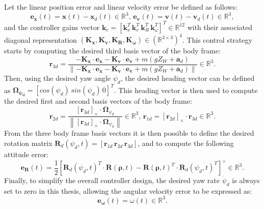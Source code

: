 Let the linear position error and linear velocity error be defined as follows:
\begin{equation}\label{eq:pos_error}
  \boldsymbol{e_x}(t) = \boldsymbol{x}(t) - \boldsymbol{x}_d(t) \in \mathbb{R}^3, \,
  \boldsymbol{e_v}(t) = \boldsymbol{v}(t) - \boldsymbol{v}_d(t) \in \mathbb{R}^3,
\end{equation}
and the controller gains vector \(\boldsymbol{k}_c = [\boldsymbol{k}_{x}^T \, \boldsymbol{k}_{v}^T \, \boldsymbol{k}_{R}^T \, \boldsymbol{k}_{\omega}^T]^T \in \mathbb{R}^{12}\) with their associated diagonal representation $(\boldsymbol{K_x}, \boldsymbol{K_v}, \boldsymbol{K_R}, \boldsymbol{K_\omega}) \in (\mathbb{R}^{3\times3})^4$.
This control strategy starts by computing the desired third basis vector of the body frame:
\begin{equation}
  \boldsymbol{r}_{3d} = \frac{-\boldsymbol{K_x} \cdot \boldsymbol{e_x} - \boldsymbol{K_v} \cdot \boldsymbol{e_v} + m(g Z_W + \boldsymbol{a}_d) }{\left\| -\boldsymbol{K_x} \cdot \boldsymbol{e_x} - \boldsymbol{K_v} \cdot \boldsymbol{e_v} + m(g Z_W + \boldsymbol{a}_d) \right\|} \in \mathbb{R}^3.
\end{equation}
Then, using the desired yaw angle $\psi_d$, the desired heading vector can be defined as $\boldsymbol{\Omega_{\psi_d}} = [cos(\psi_d) \, sin(\psi_d) \, 0]^T$.
This heading vector is then used to compute the desired first and second basis vectors of the body frame:
\begin{equation}
  \boldsymbol{r}_{2d} = \frac{\left[\boldsymbol{r}_{3d}\right]_{\times} \cdot \boldsymbol{\Omega}_{\psi_d}}{\left\|\left[\boldsymbol{r}_{3d}\right]_{\times} \cdot \boldsymbol{\Omega}_{\psi_d}\right\|} \in \mathbb{R}^3, \, \boldsymbol{r}_{1d} = \left[\boldsymbol{r}_{2d}\right]_{\times} \cdot \boldsymbol{r}_{3d} \in \mathbb{R}^3.
\end{equation}
From the three body frame basis vectors it is then possible to define the desired rotation matrix $\boldsymbol{R}_d(\psi_d, t) = [\boldsymbol{r}_{1d} \, \boldsymbol{r}_{2d} \, \boldsymbol{r}_{3d}]$, and to compute the following attitude error:
\begin{equation}\label{eq:att_error}
  \boldsymbol{e_R}(t) = \frac{1}{2}[\boldsymbol{R}_d(\psi_d, t)^T \cdot \boldsymbol{R}(\boldsymbol{\rho}, t) - \boldsymbol{R}(\boldsymbol{\rho}, t)^T \cdot \boldsymbol{R}_d(\psi_d, t)^T]^\vee \in \mathbb{R}^3.
\end{equation}
Finally, to simplify the overall controller design, the desired yaw rate $\Dot{\psi}_d$ is always set to zero in this thesis, allowing the angular velocity error to be expressed as:
\begin{equation}\label{eq:rate_error}
  \boldsymbol{e_\omega}(t) = \omega(t) \in \mathbb{R}^3.
\end{equation}

